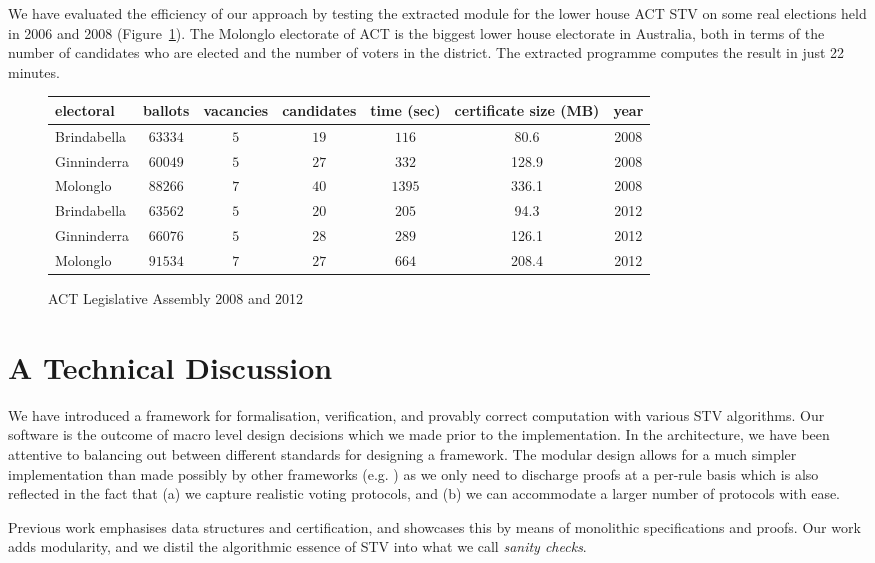 \documentclass{llncs}
\begin{document}
 
 We have evaluated the efficiency of our approach by testing the
 extracted module for the lower house ACT STV on some real elections
 held in 2006 and 2008 (Figure~\ref{ref;figure6}). The Molonglo
 electorate of ACT is the biggest lower house electorate in
 Australia, both in terms of the number of candidates who are
 elected and the number of voters in the district. The extracted
 programme computes the result in just 22 minutes.  \begin{small}
\begin{figure}[b]
\centering
\begin{tabular}{|l |c |c |c |c |c|c|}
\hline
electoral & ballots& vacancies& candidates& time (sec)& certificate size (MB)&year\\
\hline
Brindabella &$63334$&$5$&$19$&$116$&80.6&2008\\
Ginninderra &$60049$&$5$&$27$&$332$&128.9&2008\\
Molonglo &$88266$&$7$&$40$&$1395$&336.1&2008\\
Brindabella&$63562$&$5$&$20$&$205$&94.3&2012\\
Ginninderra&$66076$&$5$&$28$&$289$&126.1&2012\\
Molonglo&$91534$&$7$&$27$&$664$&208.4&2012\\
\hline
\end{tabular}
\caption{ACT Legislative Assembly 2008 and 2012}
\label{ref;figure6}
\end{figure}
\end{small}  
\section{A Technical Discussion}
We have introduced a framework for formalisation, verification, and
provably correct computation with various STV algorithms. Our
software is the outcome of macro level design decisions which we
made prior to the implementation. In the architecture, we have been
attentive to  balancing out between different standards for
designing a framework. The modular design allows for a much simpler
implementation than made possibly by other frameworks (e.g.
\cite{Ghale:2017:FVS}) as we only need to discharge proofs at a
per-rule basis which is also reflected in the fact that (a) we
capture realistic voting protocols, and (b) we can accommodate a
larger number of protocols with ease.
  

Previous work emphasises data structures and certification, and
showcases this by means of monolithic specifications and proofs. Our
work adds modularity,  and we distil the algorithmic essence of STV
into what we call \emph{sanity checks}.
\end{document}
